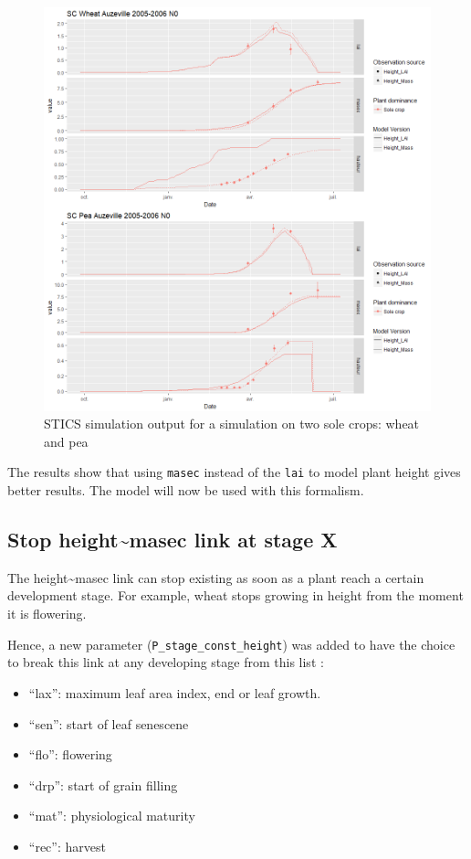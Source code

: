 \documentclass[
]{book}
\providecommand{\tightlist}{%
  \setlength{\itemsep}{0pt}\setlength{\parskip}{0pt}}
\begin{document}
\begin{figure}
\centering
\includegraphics{img/height_Wheat_SC.png}
\caption{\label{fig:heightWheatSC}STICS simulation output for a simulation on two sole crops: wheat and pea}
\end{figure}

The results show that using \texttt{masec} instead of the \texttt{lai} to model plant height gives better results. The model will now be used with this formalism.

\hypertarget{stop-heightmasec-link-at-stage-x}{%
\subsection{Stop height\textasciitilde masec link at stage X}\label{stop-heightmasec-link-at-stage-x}}

The height\textasciitilde masec link can stop existing as soon as a plant reach a certain development stage. For example, wheat stops growing in height from the moment it is flowering.

Hence, a new parameter (\texttt{P\_stage\_const\_height}) was added to have the choice to break this link at any developing stage from this list :

\begin{itemize}
\tightlist
\item
  ``lax'': maximum leaf area index, end or leaf growth.\\
\item
  ``sen'': start of leaf senescene\\
\item
  ``flo'': flowering\\
\item
  ``drp'': start of grain filling\\
\item
  ``mat'': physiological maturity\\
\item
  ``rec'': harvest
\end{itemize}
\end{document}
